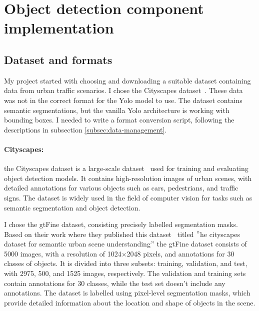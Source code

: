 


\section{Object detection component implementation}\label{sec:object-detection-component-implementation}

\subsection{Dataset and formats}\label{subsec:dataset-and-formats}
My project started with choosing and downloading a suitable dataset containing data from urban traffic scenarios.
I chose the Cityscapes dataset~\cite{Cordts2016Cityscapes}.
These data was not in the correct format for the Yolo model to use.
The dataset contains semantic segmentations, but the vanilla Yolo architecture is working with bounding boxes.
I needed to write a format conversion script, following the descriptions in subsection \ref{subsec:data-management}.


\paragraph{Cityscapes:}\label{par:cityscapes}
the Cityscapes dataset is a large-scale dataset~\cite{Cordts2016Cityscapes} used for training and evaluating object detection models.
It contains high-resolution images of urban scenes, with detailed annotations for various objects such as cars,
pedestrians, and traffic signs.
The dataset is widely used in the field of computer vision for tasks such as semantic segmentation and object detection.


I chose the gtFine dataset, consisting precisely labelled segmentation masks.
Based on their work where they published this dataset~\cite{Cordts2016Cityscapes} titled \("\)he cityscapes dataset for semantic urban scene understanding\("\)
the gtFine dataset consists of 5000 images,
with a resolution of 1024\(\times\)2048 pixels, and annotations for 30 classes of objects.
It is divided into three subsets: training, validation, and test, with 2975, 500, and 1525 images, respectively.
The validation and training sets contain annotations for 30 classes, while the test set doesn't include any annotations.
The dataset is labelled using pixel-level segmentation masks, which provide detailed information about the
location and shape of objects in the scene.

